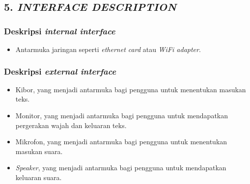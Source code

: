 \subsection*{\textcolor{subsectioncolor}{\textsf{5. \textit{INTERFACE DESCRIPTION}}}}


\subsubsection*{Deskripsi \textit{internal interface}}
\begin{itemize}
\item Antarmuka jaringan seperti \textit{ethernet card} atau \textit{WiFi adapter}.
\end{itemize}

\subsubsection*{Deskripsi \textit{external interface}}
\begin{itemize}
\item Kibor, yang menjadi antarmuka bagi pengguna untuk menentukan masukan teks.
\item Monitor, yang menjadi antarmuka bagi pengguna untuk mendapatkan pergerakan wajah dan keluaran teks.
\item Mikrofon, yang menjadi antarmuka bagi pengguna untuk menentukan masukan suara.
\item \textit{Speaker}, yang menjadi antarmuka bagi pengguna untuk mendapatkan keluaran suara.
\end{itemize}
